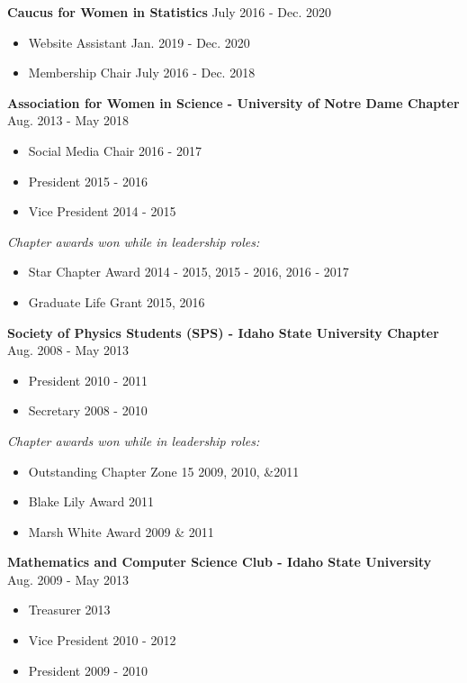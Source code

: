 \documentclass[11pt, letterpaper, roman]{moderncv} %
\newcommand{\leadershipspace}{\vspace{5pt}}
\begin{document}
\leadershipspace
\textbf{Caucus for Women in Statistics} \hfill July 2016 - Dec. 2020
\begin{itemize}
    \item Website Assistant \hfill Jan. 2019 - Dec. 2020
    \item Membership Chair \hfill July 2016 - Dec. 2018
\end{itemize}

\leadershipspace
\textbf{Association for Women in Science - University of Notre Dame Chapter} \hfill Aug. 2013 - May 2018
\begin{itemize}
    \item Social Media Chair \hfill 2016 - 2017
    \item President \hfill 2015 - 2016
    \item Vice President \hfill 2014 - 2015
\end{itemize}
\textit{Chapter awards won while in leadership roles:}
\begin{itemize}
    \item Star Chapter Award \hfill 2014 - 2015, 2015 - 2016, 2016 - 2017
    \item Graduate Life Grant \hfill 2015, 2016
\end{itemize}

\leadershipspace
\textbf{Society of Physics Students (SPS) - Idaho State University Chapter} \hfill Aug. 2008 - May 2013

\begin{itemize}
    \item President \hfill 2010 - 2011
    \item Secretary \hfill 2008 - 2010
\end{itemize}
\textit{Chapter awards won while in leadership roles:}
\begin{itemize}
    \item Outstanding Chapter Zone 15 \hfill 2009, 2010, \&2011
    \item Blake Lily Award \hfill 2011
    \item Marsh White Award \hfill 2009 \& 2011
\end{itemize}

\leadershipspace
\textbf{Mathematics and Computer Science Club - Idaho State University} \hfill Aug. 2009 - May 2013
\begin{itemize}
    \item Treasurer \hfill 2013
    \item Vice President \hfill 2010 - 2012
    \item President \hfill 2009 - 2010
\end{itemize}
\end{document}
